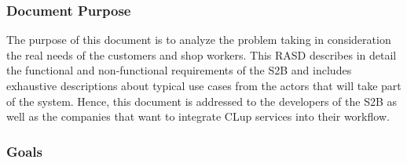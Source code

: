 \subsubsection{Document Purpose}

The purpose of this document is to analyze the problem taking in consideration the real needs of the customers and shop workers.
This RASD describes in detail the functional and non-functional requirements of the S2B and includes exhaustive descriptions about typical use cases from the actors that will take part of the system.
Hence, this document is addressed to the developers of the S2B as well as the companies that want to integrate CLup services into their workflow.

\vfill

\pagebreak

\subsubsection{Goals}
\renewcommand{\arraystretch}{1.4}
